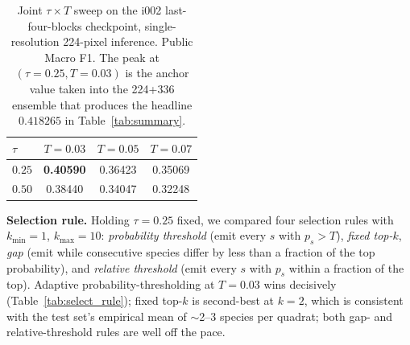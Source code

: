 \documentclass[sigconf]{ceurart}
\begin{document}
\begin{table}[ht]
\centering
\small
\begin{tabular}{lccc}
\toprule
$\tau$ & $T{=}0.03$ & $T{=}0.05$ & $T{=}0.07$ \\
\midrule
$0.25$ & \textbf{0.40590} & 0.36423 & 0.35069 \\
$0.50$ & 0.38440 & 0.34047 & 0.32248 \\
\bottomrule
\end{tabular}
\caption{Joint $\tau \times T$ sweep on the i002 last-four-blocks checkpoint, single-resolution 224-pixel inference. Public Macro F1. The peak at $(\tau{=}0.25, T{=}0.03)$ is the anchor value taken into the 224+336 ensemble that produces the headline $0.418265$ in Table~\ref{tab:summary}.}
\label{tab:tau_T}
\end{table}

\textbf{Selection rule.} Holding $\tau{=}0.25$ fixed, we compared four selection rules with $k_{\min}{=}1$, $k_{\max}{=}10$: \emph{probability threshold} (emit every $s$ with $p_s > T$), \emph{fixed top-$k$}, \emph{gap} (emit while consecutive species differ by less than a fraction of the top probability), and \emph{relative threshold} (emit every $s$ with $p_s$ within a fraction of the top). Adaptive probability-thresholding at $T{=}0.03$ wins decisively (Table~\ref{tab:select_rule}); fixed top-$k$ is second-best at $k{=}2$, which is consistent with the test set's empirical mean of $\sim$2--3 species per quadrat; both gap- and relative-threshold rules are well off the pace.
\end{document}
